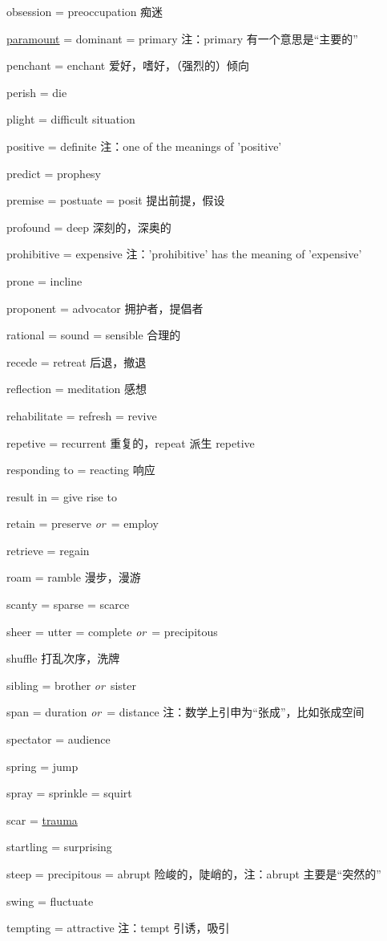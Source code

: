 \documentclass[UTF8, fontset = none, zihao = -4, linespread = 1.1]{ctexart}
\renewcommand{\o}{\textit{or}\ }
\begin{document}
\begin{multicols}{2}
obsession = preoccupation 痴迷

\underline{paramount} = dominant = primary 注：primary 有一个意思是“主要的”

penchant = enchant 爱好，嗜好，（强烈的）倾向

perish = die

plight = difficult situation

positive = definite 注：one of the meanings of 'positive'

predict = prophesy

premise = postuate = posit 提出前提，假设

profound = deep 深刻的，深奥的

prohibitive = expensive 注：'prohibitive' has the meaning of 'expensive'

prone = incline

proponent = advocator 拥护者，提倡者

rational = sound = sensible 合理的

recede = retreat 后退，撤退

reflection = meditation 感想

rehabilitate = refresh = revive

repetive = recurrent 重复的，repeat 派生 repetive

responding to = reacting 响应

result in = give rise to

retain = preserve \o = employ

retrieve = regain

roam = ramble 漫步，漫游

scanty = sparse = scarce

sheer = utter = complete \o = precipitous

shuffle 打乱次序，洗牌

sibling = brother \o sister

span = duration \o = distance 注：数学上引申为“张成”，比如张成空间

spectator = audience

spring = jump

spray = sprinkle = squirt

scar = \underline{trauma}

startling = surprising

steep = precipitous = abrupt 险峻的，陡峭的，注：abrupt 主要是“突然的”

swing = fluctuate

tempting = attractive 注：tempt 引诱，吸引


\end{multicols}
\end{document}
